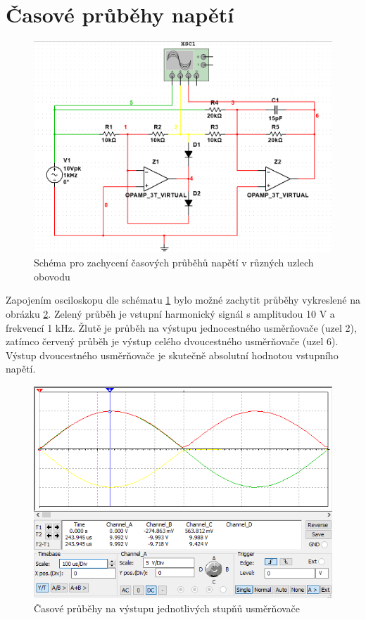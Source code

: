 \documentclass[twoside]{article}
\begin{document}
\newpage
\section{Časové průběhy napětí}

\begin{figure}[h!]
    \centering
    \includegraphics[width=0.8\linewidth]{prubehy_schema.png}
    \caption{Schéma pro zachycení časových průběhů napětí v různých uzlech obovodu}
    \label{fig:schema_prubehy}
\end{figure}

Zapojením osciloskopu dle schématu \ref{fig:schema_prubehy} bylo možné zachytit průběhy vykreslené
na obrázku \ref{fig:prubehy}. Zelený průběh je vstupní harmonický signál s amplitudou 10 V a frekvencí 1 kHz.
Žlutě je průběh na výstupu jednocestného usměrňovače (uzel 2), zatímco červený průběh je výstup celého 
dvoucestného usměrňovače (uzel 6). Výstup dvoucestného usměrňovače je skutečně absolutní hodnotou vstupního napětí.

\begin{figure}[h!]
    \centering
    \includegraphics[width=0.8\linewidth]{prubehy_usmernovacu.png}
    \caption{Časové průběhy na výstupu jednotlivých stupňů usměrňovače}
    \label{fig:prubehy}
\end{figure}
\end{document}
